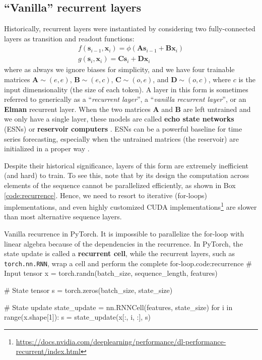 \vspace{-0.5em}
\subsection{“Vanilla” recurrent layers} \addclock

Historically, recurrent layers were instantiated by considering two fully-connected layers as transition and readout functions:
%
\begin{gather}
f(\mathbf{s}_{i-1},\mathbf{x}_i)= \phi(\mathbf{A}\mathbf{s}_{i-1}+\mathbf{B}\mathbf{x}_i)\\g(\mathbf{s}_i,\mathbf{x}_i)=\mathbf{C}\mathbf{s}_i+\mathbf{D}\mathbf{x}_i
\end{gather}
%
where as always we ignore biases for simplicity, and we have four trainable matrices $\mathbf{A} \sim (e,e)$, $\mathbf{B} \sim (e,c)$, $\mathbf{C} \sim (o,e)$, and $\mathbf{D} \sim (o,c)$, where $c$ is the input dimensionality (the size of each token). A layer in this form is sometimes referred to generically as a “\textit{recurrent layer}”, a “\textit{vanilla recurrent layer}”, or an \textbf{Elman} recurrent layer. When the two matrices $\mathbf{A}$ and $\mathbf{B}$ are left untrained and we only have a single layer, these models are called \textbf{echo state networks} (ESNs) or \textbf{reservoir computers} \cite{lukovsevivcius2009reservoir}. ESNs can be a powerful baseline for time series forecasting, especially when the untrained matrices (the reservoir) are initialized in a proper way \cite{gauthier2021next}.

Despite their historical significance, layers of this form are extremely inefficient (and hard) to train. To see this, note that by its design the computation across elements of the sequence cannot be parallelized efficiently, as shown in Box \ref{code:recurrence}. Hence, we need to resort to iterative (for-loops) implementations, and even highly customized CUDA implementations\footnote{\url{https://docs.nvidia.com/deeplearning/performance/dl-performance-recurrent/index.html}} are slower than most alternative sequence layers. 

\begin{mypy}{Vanilla recurrence in PyTorch. It is impossible to parallelize the for-loop with linear algebra because of the dependencies in the recurrence. In PyTorch, the state update is called a \textbf{recurrent cell}, while the recurrent layers, such as {\footnotesize\texttt{torch.nn.RNN}}, wrap a cell and perform the complete for-loop.}{code:recurrence}
# Input tensor
x = torch.randn(batch_size, sequence_length, features)

# State tensor
s = torch.zeros(batch_size, state_size)

# State update
state_update = nn.RNNCell(features, state_size)
for i in range(x.shape[1]):
  s = state_update(x[:, i, :], s)
\end{mypy}

